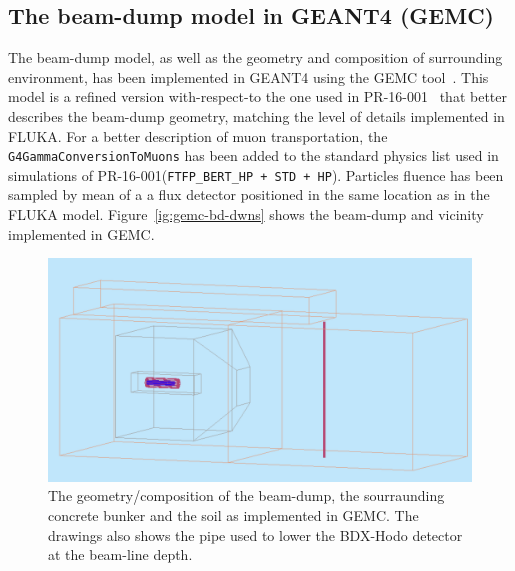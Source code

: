 \subsection{The beam-dump model in GEANT4 (GEMC)}
The beam-dump model, as well as the geometry and composition  of surrounding environment,
 has been implemented in GEANT4 using the GEMC tool~\cite{gemc}. This model is a refined version with-respect-to the one used  in PR-16-001~\cite{bdx-proposal} that better describes the beam-dump geometry, matching the level of details  implemented in FLUKA. For a better description of  muon transportation, the {\tt G4GammaConversionToMuons} has been added to the standard physics list used in simulations of  PR-16-001({\tt FTFP\_BERT\_HP + STD + HP}).
Particles fluence has been sampled  by mean of a  a flux detector  positioned in the same location as in the FLUKA model.
Figure~\ref{ig:gemc-bd-dwns} shows the beam-dump and vicinity implemented in GEMC.
\begin{figure}[h!] 
\center
\includegraphics[width=12.5cm]{figs/gemc-bd-dwns.pdf}  
\caption{The geometry/composition  of the beam-dump, the sourraunding concrete bunker and  the soil as implemented in GEMC. The drawings also shows the pipe used to lower the BDX-Hodo detector at the  beam-line depth.}
\label{fig:gemc-bd-dwns}
\end{figure}
